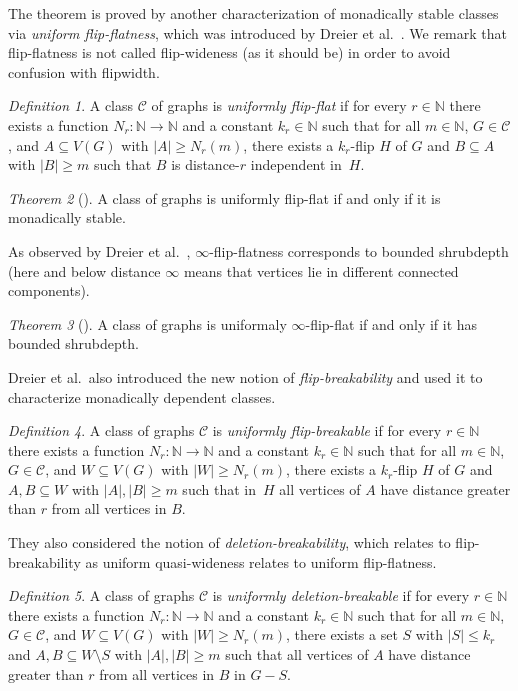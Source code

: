 \documentclass[1p,number,a4paper]{elsarticle}
\theoremstyle{remark}
\newcommand{\Cc}{\mathscr{C}}
\newcommand{\N}{\mathbb{N}}
\newtheorem{theorem}{Theorem}[section]
\newtheorem{definition}[theorem]{Definition}
\begin{document}
The theorem is proved by another characterization of monadically stable classes via \emph{uniform flip-flatness}, which was introduced by Dreier et al.~\cite{DreierMST23}. 
We remark that flip-flatness is not called flip-wideness (as it should be) in order to avoid confusion with flipwidth. 

\begin{definition}
A class $\Cc$ of graphs is \emph{uniformly flip-flat}
if for every $r \in \N$ there exists a function $N_r \colon \N \rightarrow \N$ and a constant $k_r\in \N$ such that for all $m\in\N$, $G\in \Cc$, and $A\subseteq V(G)$ with $|A|\geq N_r(m)$, there exists a $k_r$-flip $H$ of $G$ and $B\subseteq A$ with $|B|\geq m$ such that $B$ is distance-$r$ independent in~$H$. 
\end{definition}

\begin{theorem}[\cite{DreierMST23}]
    A class of graphs is uniformly flip-flat if and only if it is monadically stable. 
\end{theorem}

As observed by Dreier et al.~\cite{dreier2024flip}, $\infty$-flip-flatness corresponds to bounded shrubdepth (here and below distance $\infty$ means that vertices lie in different connected components). 


\begin{theorem}[\cite{dreier2024flip}]
    A class of graphs is uniformaly $\infty$-flip-flat if and only if it has bounded shrubdepth.
\end{theorem}

Dreier et al.\ also introduced the new notion of \emph{flip-breakability} and used it to characterize monadically dependent classes. 

\begin{definition}
A class of graphs $\Cc$ is \emph{uniformly flip-breakable}
if for every $r \in \N$ there exists a function $N_r \colon \N \rightarrow \N$ and a constant $k_r\in \N$ such that for all $m\in\N$, $G\in \Cc$, and $W\subseteq V(G)$ with $|W|\geq N_r(m)$, there exists a $k_r$-flip $H$ of $G$ and $A,B\subseteq W$ with $|A|,|B|\geq m$ such that in~$H$ all vertices of $A$ have distance greater than $r$ from all vertices in $B$. 
\end{definition}

They also considered the notion of \emph{deletion-breakability}, which relates to flip-breakability as uniform quasi-wideness relates to uniform flip-flatness. 

\begin{definition}
A class of graphs $\Cc$ is \emph{uniformly deletion-breakable}
if for every $r \in \N$ there exists a function $N_r \colon \N \rightarrow \N$ and a constant $k_r\in \N$ such that for all $m\in\N$, $G\in \Cc$, and $W\subseteq V(G)$ with $|W|\geq N_r(m)$, there exists a set $S$ with $|S|\leq k_r$ and $A,B\subseteq W\setminus S$ with $|A|,|B|\geq m$ such that all vertices of $A$ have distance greater than $r$ from all vertices in $B$ in $G-S$. 
\end{definition}
\end{document}
